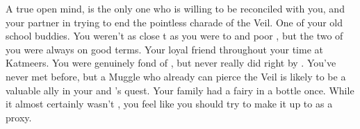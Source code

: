 \documentclass[char]{Katmeers}
\begin{document}
\begin{contacts}
	\contact{\cLuna{}} A true open mind, \cLuna{} is the only one who is willing to be reconciled with you, and your partner in trying to end the pointless charade of the Veil.
	\contact{\cLucius{}} One of your old school buddies. You weren't as close t \cLucius{\them} as you were to \cGoyle{\formal} and poor \cGhost{\formal}, but the two of you were always on good terms.
	\contact{\cGoyle{}} Your loyal friend throughout your time at Katmeers. You were genuinely fond of \cGoyle{\them}, but never really did right by \cGoyle{\them}.
	\contact{\cHarry{\MYname}} You've never met \cHarry{\them} before, but a Muggle who already can pierce the Veil is likely to be a valuable ally in your and \cLuna{}'s quest.
	\contact{\cFairy{}} Your family had a fairy in a bottle once. While it almost certainly wasn't \cFairy{\them}, you feel like you should try to make it up to \cFairy{\them} as a proxy.
\end{contacts}
\end{document}
